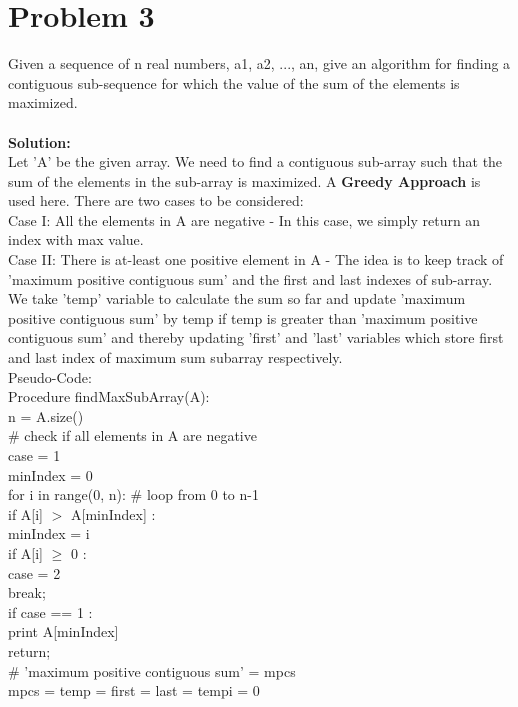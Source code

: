 \documentclass{article}
\newcommand\tab[1][4mm]{\hspace*{#1}}
\begin{document}
     
\section*{Problem 3}
Given a sequence of n real numbers, a1, a2, ..., an, give an algorithm for finding a contiguous sub-sequence for which the value of the sum of the elements is maximized. \\
\vspace{1mm} \\
\textbf{Solution:} \\
Let 'A' be the given array. We need to find a contiguous sub-array such that the sum of the elements in the sub-array is maximized. A \textbf{Greedy Approach} is used here. There are two cases to be considered: \\
Case I: All the elements in A are negative - In this case, we simply return an index with max value. \\
Case II: There is at-least one positive element in A - The idea is to keep track of 'maximum positive contiguous sum' and the first and last indexes of sub-array. We take 'temp' variable to calculate the sum so far and update 'maximum positive contiguous sum' by temp if temp is greater than 'maximum positive contiguous sum' and thereby updating 'first' and 'last' variables which store first and last index of maximum sum subarray respectively. \\
Pseudo-Code: \\
Procedure findMaxSubArray(A): \\
\tab n = A.size() \\
\tab \# check if all elements in A are negative \\
\tab case = 1 \\
\tab minIndex = 0 \\
\tab for i in range(0, n): \# loop from 0 to n-1  \\
\tab\tab if A[i] $>$ A[minIndex] : \\
\tab\tab\tab minIndex = i \\
\tab\tab if A[i] $\geq$ 0 : \\
\tab\tab\tab case = 2 \\
\tab\tab\tab break; \\
\tab if case == 1 : \\
\tab\tab print A[minIndex] \\
\tab\tab return; \\
\tab \# 'maximum positive contiguous sum' = mpcs \\
\tab mpcs = temp = first = last = tempi = 0 \\
\end{document}
